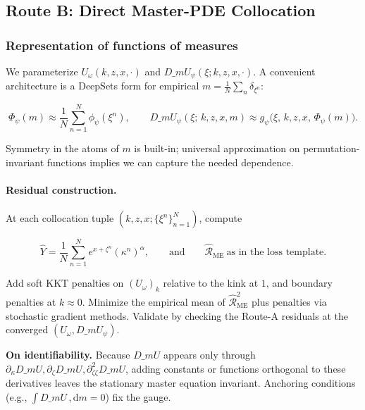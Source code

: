 \documentclass[11pt,letterpaper,oneside]{article}
\numberwithin{equation}{section}
\newcommand{\1}{\mathbf{1}}
\newcommand{\diff}{,\mathrm{d}}
\newcommand{\dmU}{D\_m U}
\begin{document}
\subsection{Route B: Direct Master-PDE Collocation}\label{sec:routeB}

\subsubsection*{Representation of functions of measures}
\begin{sloppypar}
We parameterize $U_\omega(k,z,x,\cdot)$ and $\dmU_\psi(\xi;k,z,x,\cdot)$. A convenient architecture is a DeepSets form for empirical $m=\tfrac1N\sum_{n}\delta_{\xi^n}$:

$$
\Phi_\psi(m)\approx \frac{1}{N}\sum_{n=1}^N \phi_\psi(\xi^n),\qquad
\dmU_\psi(\xi;\,k,z,x,m)\approx g_\psi\big(\xi,\,k,z,x,\, \Phi_\psi(m)\big).
$$

Symmetry in the atoms of $m$ is built-in; universal approximation on permutation-invariant functions implies we can capture the needed dependence.
\end{sloppypar}

\paragraph{Residual construction.}
At each collocation tuple $(k,z,x;\{\xi^n\}_{n=1}^N)$, compute

$$
\widehat Y=\frac{1}{N}\sum_{n=1}^N e^{x+\zeta^n}(\kappa^n)^\alpha,\qquad
\text{and}\qquad
\widehat{\mathcal{R}}_{\mathrm{ME}}\ \text{as in the loss template}.
$$

Add soft KKT penalties on $(U_\omega)_k$ relative to the kink at $1$, and boundary penalties at $k\approx 0$. Minimize the empirical mean of $\widehat{\mathcal{R}}_{\mathrm{ME}}^2$ plus penalties via stochastic gradient methods. Validate by checking the Route-A residuals at the converged $(U_\omega,\dmU_\psi)$.

\begin{tcolorbox}[mathstyle]
\textbf{On identifiability.} Because $\dmU$ appears only through $\partial_\kappa\dmU, \partial_\zeta\dmU, \partial_{\zeta\zeta}^2\dmU$, adding constants or functions orthogonal to these derivatives leaves the stationary master equation invariant. Anchoring conditions (e.g., $\int \dmU\,\diff m=0$) fix the gauge.
\end{tcolorbox}

\end{document}

